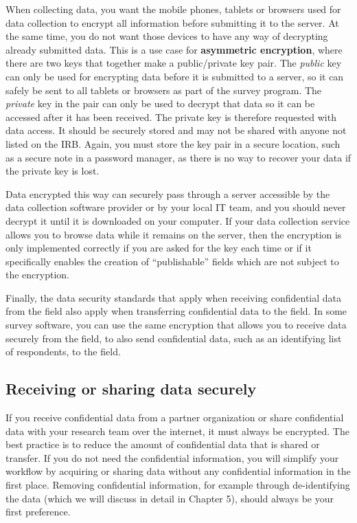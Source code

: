 When collecting data, you want the mobile phones, tablets or browsers used for data collection
to encrypt all information before submitting it to the server.
At the same time, you do not want those devices to have any way of decrypting already submitted data.
This is a use case for \textbf{asymmetric encryption},
where there are two keys that together make a public/private key pair.
The \textit{public} key can only be used for encrypting data before it is submitted to a server,
so it can safely be sent to all tablets or browsers as part of the survey program.
The \textit{private} key in the pair can only be used to decrypt that data
so it can be accessed after it has been received.
The private key is therefore requested with data access.
It should be securely stored
and may not be shared with anyone not listed on the IRB.
Again, you must store the key pair in a secure location,
such as a secure note in a password manager,
as there is no way to recover your data if the private key is lost.

Data encrypted this way can securely pass
through a server accessible by the data collection software provider
or by your local IT team,
and you should never decrypt it until it is downloaded on your computer.
If your data collection service allows you
to browse data while it remains on the server,
then the encryption is only implemented correctly
if you are asked for the key each time
or if it specifically enables the creation of ``publishable''
fields which are not subject to the encryption.

Finally, the data security standards that apply
when receiving confidential data from the field
also apply when transferring confidential data to the field.
In some survey software,
you can use the same encryption that allows you to receive data securely
from the field, to also send confidential data,
such as an identifying list of respondents, to the field.

\subsection{Receiving or sharing data securely}

If you receive confidential data from a partner organization
or share confidential data with your research team over the internet,
it must always be encrypted.
The best practice is to reduce the amount of confidential data
that is shared or transfer.
If you do not need the confidential information, you will simplify your workflow
by acquiring or sharing data without any confidential information in the first place.
Removing confidential information, for example through de-identifying the data
(which we will discuss in detail in Chapter 5), should always be your first preference.

